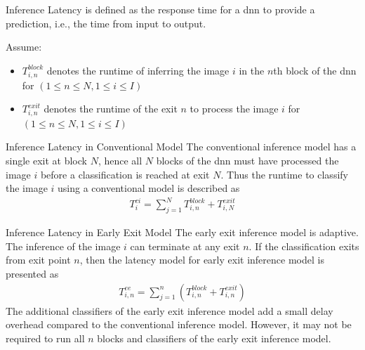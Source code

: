 \begin{enumdescript}
	\item[Inference Latency] is defined as the response time for a \gls{dnn} to provide a prediction, i.e., the time from input to output. 
	
	Assume:
	\begin{itemize}
		\item $T_{i,n}^{block}$ denotes the runtime of inferring the image $ i $ in the $ n $th block of the \gls{dnn} for $ \left(1\leq n \leq N, 1 \leq i \leq I\right) $
		\item $T_{i,n}^{exit}$ denotes the runtime of the exit $ n $  to process the image $i$ for $ \left(1\leq n \leq N, 1 \leq i \leq I\right) $
	\end{itemize}
	\begin{enumdescript}
		\item[Inference Latency in Conventional Model] The conventional inference model has a single exit at block $ N $, hence all $ N $ blocks of the \gls{dnn} must have processed the image $ i $ before a classification is reached at exit $ N $. Thus the runtime to classify the image $ i $ using a conventional model is described as
		\begin{align}
		T^{ci}_{i}= \sum_{j=1}^{N} T_{i,n}^{block} + T_{i,N}^{exit}
		\end{align}
		\item[Inference Latency in Early Exit Model] The early exit inference model is adaptive. The inference of the image $ i $ can terminate at any exit $ n $. If the classification exits from exit point $ n $, then the latency model for early exit inference model is presented as
		\begin{align}
		T_{i,n}^{ee}=\sum_{j=1}^{n} \left(T_{i,n}^{block} + T_{i,n}^{exit} \right) 
		\end{align}
		The additional classifiers of the early exit inference model add a small delay overhead compared to the conventional inference model. However, it may not be required to run all $ n $ blocks and classifiers of the early exit inference model. 
	\end{enumdescript}
	

\end{enumdescript}
